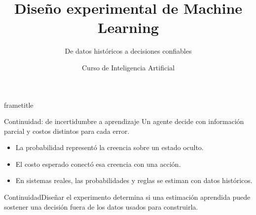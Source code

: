 \documentclass[aspectratio=169,10pt]{beamer}
\title[IA · Clase 5]{Diseño experimental de Machine Learning}
\subtitle{De datos históricos a decisiones confiables}
\author{Curso de Inteligencia Artificial}
\institute{Semana 5 · Clase 5}
\date{}
\newcommand{\br}{\\}
\begin{document}
\begin{frame}[plain]
  \begin{beamercolorbox}[wd=\paperwidth,ht=\paperheight,sep=2em]{frametitle}
    \vfill
    {\Huge\inserttitle\par}
    \vspace{1em}
    \par
    \vfill {\color{UAPGold}\large\insertauthor\par}{\color{white}\insertinstitute\par}
  \end{beamercolorbox}
\end{frame}

\begin{frame}{Continuidad: de incertidumbre a aprendizaje}
  \small Un agente decide con información parcial y costos distintos para cada error.
  \begin{itemize}
    \item La probabilidad representó la creencia sobre un estado oculto.
    \item El costo esperado conectó esa creencia con una acción.
    \item En sistemas reales, las probabilidades y reglas se estiman con datos históricos.
  \end{itemize}
  \begin{block}{Continuidad}Diseñar el experimento determina si una estimación aprendida puede sostener una decisión fuera de los datos usados para construirla.\end{block}
\end{frame}
\end{document}
